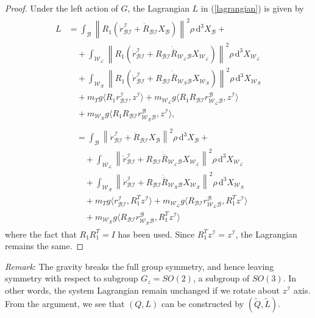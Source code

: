 \documentclass[letterpaper, 10 pt, conference]{ieeeconf}  \newcommand{\RN}[1]{\textup{\uppercase\expandafter{\romannumeral#1}}}
\newcommand{\norm}[1]{\left\lVert{#1}\right\rVert}
\begin{document}
\begin{proof}
Under the left action of $G$, the Lagrangian $L$ in (\ref{lagrangian}) is given by
\begin{align}\nonumber
\begin{split}
L &= \int_\mathcal{B} \norm{R_{1}(\dot{r}_\mathcal{BI}^{\mathcal{I}}+\dot{R}_\mathcal{BI}X_{\mathcal{B}})}^2\rho \, \mathrm d^3 X_\mathcal{B} + \\
& \quad +\int_\mathcal{W_L} \norm{R_{1}(\dot{r}_\mathcal{BI}^{\mathcal{I}}+\dot{\overline{R_\mathcal{BI} R_\mathcal{W_L B}}}X_\mathcal{W_L})}^2\rho \, \mathrm d^3 X_\mathcal{W_L} \\
& \quad + \int_\mathcal{W_R} \norm{R_{1}(\dot{r}_\mathcal{BI}^{\mathcal{I}}+\dot{\overline{R_\mathcal{BI} R_\mathcal{W_R B}}}X_\mathcal{W_R})}^2\rho \, \mathrm d^{3}X_\mathcal{W_R} \\
& \quad + m_{T}g \langle R_{1}r_\mathcal{BI}^{\mathcal{I}}, z^{\mathcal{I}} \rangle + m_{\mathcal{W_L}}g\langle R_{1}R_{\mathcal{BI}}r_\mathcal{W_{L}B}^{\mathcal{B}}, z^{\mathcal{I}} \rangle \\
& \quad + m_{\mathcal{W_R}}g\langle R_{1}R_{\mathcal{BI}}r_\mathcal{W_{R}B}^{\mathcal{B}}, z^{\mathcal{I}} \rangle ,
 \end{split}
\end{align}
\begin{align}
\begin{split}
& = \int_\mathcal{B} \norm{\dot{r}_\mathcal{BI}^{\mathcal{I}}+\dot{R}_\mathcal{BI}X_{\mathcal{B}}}^2\rho \, \mathrm d^3X_{\mathcal{B}} + \\
& \quad +\int_\mathcal{W_L} \norm{\dot{r}_\mathcal{BI}^{\mathcal{I}}+ \dot{\overline{R_\mathcal{BI} R_\mathcal{W_L B}}}X_\mathcal{W_L}}^2\rho \, \mathrm d^3X_{\mathcal{W_L}} \\
& \quad + \int_\mathcal{W_R} \norm{\dot{r}_\mathcal{BI}^{\mathcal{I}}+ \dot{\overline{R_\mathcal{BI} R_\mathcal{W_R B}}} X_\mathcal{W_R}}^2\rho \, \mathrm d^3X_{\mathcal{W_R}} \\
& \quad + m_{T}g \langle r_\mathcal{BI}^{\mathcal{I}}, R_{1}^{T}z^{\mathcal{I}} \rangle + m_{\mathcal{W_L}}g\langle R_{\mathcal{BI}}r_\mathcal{W_{L}B}^{\mathcal{B}}, R_{1}^{T}z^{\mathcal{I}} \rangle \\
& \quad + m_{\mathcal{W_R}}g\langle R_{\mathcal{BI}}r_\mathcal{W_{R}B}^{\mathcal{B}}, R_{1}^{T}z^{\mathcal{I}} \rangle
\end{split}
\end{align}
where the fact that $R_{1}R_{1}^{T}=I$ has been used. Since $R_{1}^{T}z^{\mathcal{I}}=z^{\mathcal{I}}$, the Lagrangian remains the same.
\end{proof}
\textit{Remark}: The gravity breaks the full group symmetry, and hence leaving symmetry with respect to subgroup $G_{z}=SO(2)$, a subgroup of $SO(3)$. In other words, the system Lagrangian remain unchanged if we rotate about $z^{\mathcal{I}}$ axis. From the argument, we see that $(Q,L)$ can be constructed by $(\tilde{Q},\tilde{L})$. 
\end{document}
